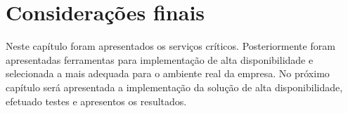 



\section{Considerações finais}

Neste capítulo foram apresentados os serviços críticos. Posteriormente foram apresentadas ferramentas para implementação de alta disponibilidade 
e selecionada a mais adequada para o ambiente real da empresa. No próximo capítulo será apresentada a implementação da solução de alta 
disponibilidade, efetuado testes e apresentos os resultados.

